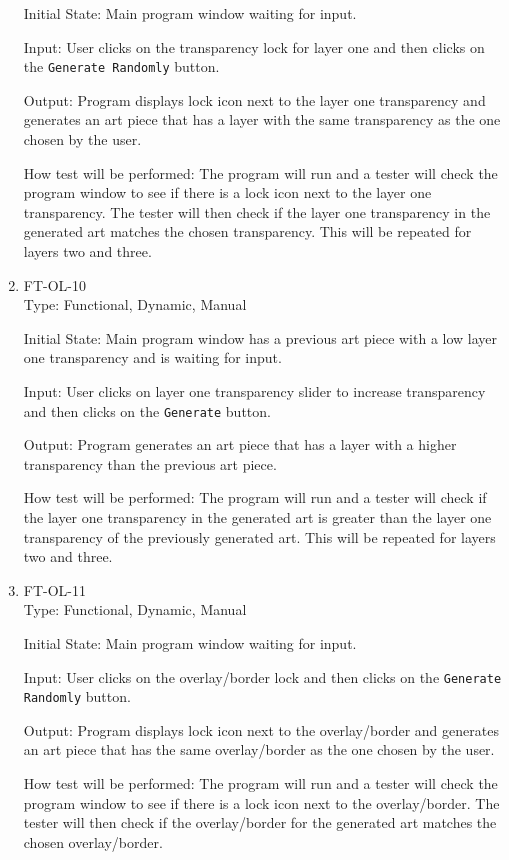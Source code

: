 \documentclass[12pt, titlepage]{article}
\begin{document}
\begin{enumerate}
Initial State: Main program window waiting for input. %

Input: User clicks on the transparency lock for layer one and then clicks on the \texttt{Generate Randomly} button.

Output: Program displays lock icon next to the layer one transparency and generates an art piece that has a layer with the same transparency as the one chosen by the user.

How test will be performed: The program will run and a tester will check the program window to see if there is a lock icon next to the layer one transparency. The tester will then check if the layer one transparency in the generated art matches the chosen transparency. This will be repeated for layers two and three.

\item{FT-OL-10\\}
Type: Functional, Dynamic, Manual

Initial State: Main program window has a previous art piece with a low layer one transparency and is waiting for input. %

Input: User clicks on layer one transparency slider to increase transparency and then clicks on the \texttt{Generate} button.

Output: Program generates an art piece that has a layer with a higher transparency than the previous art piece.

How test will be performed: The program will run and a tester will check if the layer one transparency in the generated art is greater than the layer one transparency of the previously generated art. This will be repeated for layers two and three.

\item{FT-OL-11\\}
Type: Functional, Dynamic, Manual

Initial State: Main program window waiting for input. %

Input: User clicks on the overlay/border lock and then clicks on the \texttt{Generate Randomly} button.

Output: Program displays lock icon next to the overlay/border and generates an art piece that has the same overlay/border as the one chosen by the user.

How test will be performed: The program will run and a tester will check the program window to see if there is a lock icon next to the overlay/border. The tester will then check if the overlay/border for the generated art matches the chosen overlay/border.
\end{enumerate}
\end{document}
